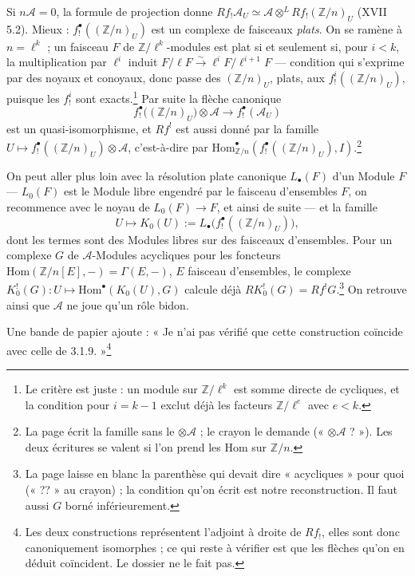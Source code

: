 \documentclass[11pt,a4paper]{article}
\begin{document}
Si $n\mathcal{A} = 0$, la formule de projection donne $Rf_!\mathcal{A}_U
\simeq \mathcal{A} \otimes^L Rf_!(\mathbb{Z}/n)_U$ (XVII 5.2). Mieux :
$f_!^{\bullet}((\mathbb{Z}/n)_U)$ est un complexe de faisceaux \emph{plats}.
On se ramène à $n = \ell^k$ ; un faisceau $F$ de $\mathbb{Z}/\ell^k$-modules
est plat si et seulement si, pour $i < k$, la multiplication par $\ell^i$
induit $F/\ell F \xrightarrow{\sim} \ell^iF/\ell^{i+1}F$ --- condition qui
s'exprime par des noyaux et conoyaux, donc passe des $(\mathbb{Z}/n)_U$,
plats, aux $f_!^i((\mathbb{Z}/n)_U)$, puisque les $f_!^i$ sont
exacts.\footnote{Le critère est juste : un module sur $\mathbb{Z}/\ell^k$ est
somme directe de cycliques, et la condition pour $i = k-1$ exclut déjà les
facteurs $\mathbb{Z}/\ell^e$ avec $e < k$.} Par suite la flèche canonique
\[
f_!^{\bullet}\bigl((\mathbb{Z}/n)_U\bigr) \otimes \mathcal{A}
\longrightarrow f_!^{\bullet}(\mathcal{A}_U)
\]
est un quasi-isomorphisme, et $Rf^!$ est aussi donné par la famille
$U \mapsto f_!^{\bullet}((\mathbb{Z}/n)_U) \otimes \mathcal{A}$, c'est-à-dire
par $\mathrm{Hom}^{\bullet}_{\mathbb{Z}/n}(f_!^{\bullet}((\mathbb{Z}/n)_U),
I)$.\footnote{La page écrit la famille sans le $\otimes \mathcal{A}$ ; le
crayon le demande (« $\otimes\mathcal{A}$ ? »). Les deux écritures se valent
si l'on prend les $\mathrm{Hom}$ sur $\mathbb{Z}/n$.}

On peut aller plus loin avec la résolution plate canonique $L_{\bullet}(F)$
d'un Module $F$ --- $L_0(F)$ est le Module libre engendré par le faisceau
d'ensembles $F$, on recommence avec le noyau de $L_0(F) \to F$, et ainsi de
suite --- et la famille
\[
U \longmapsto K_0(U) := L_{\bullet}\bigl(f_!^{\bullet}((\mathbb{Z}/n)_U)\bigr),
\]
dont les termes sont des Modules libres sur des faisceaux d'ensembles. Pour un
complexe $G$ de $\mathcal{A}$-Modules acycliques pour les foncteurs
$\mathrm{Hom}(\mathbb{Z}/n[E], -) = \Gamma(E, -)$, $E$ faisceau d'ensembles,
le complexe $K_0^!(G) : U \mapsto \mathrm{Hom}^{\bullet}(K_0(U), G)$ calcule
déjà $RK_0^!(G) = Rf^!G$.\footnote{La page laisse en blanc la parenthèse
qui devait dire « acycliques » pour quoi (« ?? » au crayon) ; la condition
qu'on écrit est notre reconstruction. Il faut aussi $G$ borné inférieurement.}
On retrouve ainsi que $\mathcal{A}$ ne joue qu'un rôle bidon.

Une bande de papier ajoute : « Je n'ai pas vérifié que cette construction
coïncide avec celle de 3.1.9. »\footnote{Les deux constructions représentent
l'adjoint à droite de $Rf_!$, elles sont donc canoniquement isomorphes ; ce
qui reste à vérifier est que les flèches qu'on en déduit coïncident. Le
dossier ne le fait pas.}
\end{document}
